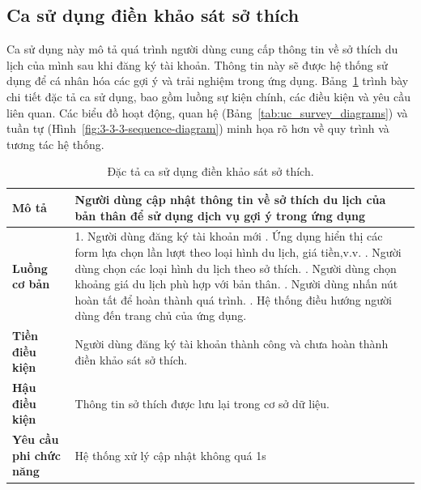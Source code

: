 \subsection{Ca sử dụng điền khảo sát sở thích}
\noindent Ca sử dụng này mô tả quá trình người dùng cung cấp thông tin về sở thích du lịch của mình sau khi đăng ký tài khoản. Thông tin này sẽ được hệ thống sử dụng để cá nhân hóa các gợi ý và trải nghiệm trong ứng dụng. Bảng~\ref{tab:uc_survey_spec} trình bày chi tiết đặc tả ca sử dụng, bao gồm luồng sự kiện chính, các điều kiện và yêu cầu liên quan. Các biểu đồ hoạt động, quan hệ (Bảng~\ref{tab:uc_survey_diagrams}) và tuần tự (Hình~\ref{fig:3-3-3-sequence-diagram}) minh họa rõ hơn về quy trình và tương tác hệ thống.

\begin{longtable}{| p{4cm} | p{\dimexpr\linewidth-4cm-4\tabcolsep} |} %
    \caption{Đặc tả ca sử dụng điền khảo sát sở thích.} %
    \label{tab:uc_survey_spec} \\ %

    \hline
    \textbf{Mô tả} & Người dùng cập nhật thông tin về sở thích du lịch của bản thân để sử dụng dịch vụ gợi ý trong ứng dụng \\
    \hline
    \endfirsthead %

    \hline
 
    \endhead

    \hline 
    \endfoot

    \hline %
    \endlastfoot

    \textbf{Luồng cơ bản} & 1. Người dùng đăng ký tài khoản mới \newline
                           2. Ứng dụng hiển thị các form lựa chọn lần lượt theo loại hình du lịch, giá tiền,v.v. \newline
                           3. Người dùng chọn các loại hình du lịch theo sở thích. \newline
                           4. Người dùng chọn khoảng giá du lịch phù hợp với bản thân. \newline
                           5. Người dùng nhấn nút hoàn tất để hoàn thành quá trình. \newline
                           6. Hệ thống điều hướng người dùng đến trang chủ của ứng dụng. \\
    \hline
    \textbf{Tiền điều kiện} & Người dùng đăng ký tài khoản thành công và chưa hoàn thành điền khảo sát sở thích. \\
    \hline
    \textbf{Hậu điều kiện} & Thông tin sở thích được lưu lại trong cơ sở dữ liệu. \\
    \hline
    \textbf{Yêu cầu phi chức năng} & Hệ thống xử lý cập nhật không quá 1s \\

\end{longtable}

